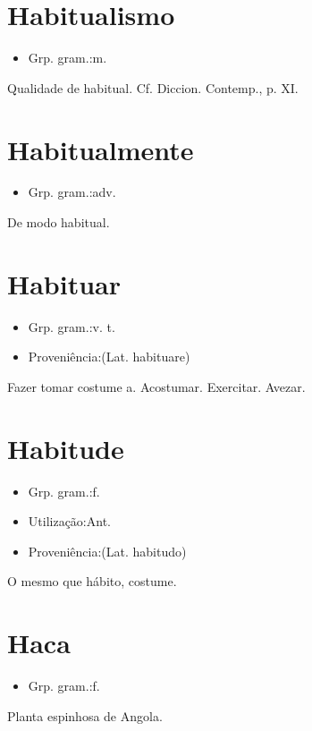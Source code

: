 \documentclass{article}
\begin{document}
\section{Habitualismo}
\begin{itemize}
\item {Grp. gram.:m.}
\end{itemize}
Qualidade de habitual. Cf. \textunderscore Diccion. Contemp.\textunderscore , p. XI.
\section{Habitualmente}
\begin{itemize}
\item {Grp. gram.:adv.}
\end{itemize}
De modo habitual.
\section{Habituar}
\begin{itemize}
\item {Grp. gram.:v. t.}
\end{itemize}
\begin{itemize}
\item {Proveniência:(Lat. \textunderscore habituare\textunderscore )}
\end{itemize}
Fazer tomar costume a.
Acostumar.
Exercitar.
Avezar.
\section{Habitude}
\begin{itemize}
\item {Grp. gram.:f.}
\end{itemize}
\begin{itemize}
\item {Utilização:Ant.}
\end{itemize}
\begin{itemize}
\item {Proveniência:(Lat. \textunderscore habitudo\textunderscore )}
\end{itemize}
O mesmo que \textunderscore hábito\textunderscore , costume.
\section{Haca}
\begin{itemize}
\item {Grp. gram.:f.}
\end{itemize}
Planta espinhosa de Angola.
\end{document}
